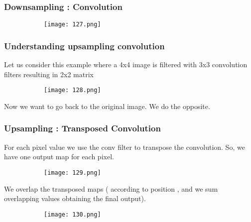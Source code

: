 \documentclass{article}
\begin{document}
\subsubsection{Downsampling : Convolution}

\begin{figure}[ht!]
  \centering
  \begin{subfigure}[b]{0.5\linewidth}
    \texttt{[image: 127.png]}
  \end{subfigure}
\end{figure}

\subsubsection{Understanding upsampling convolution}

Let us consider this example where a 4x4 image is filtered with 3x3 convolution filters resulting in 2x2 matrix 

\begin{figure}[ht!]
  \centering
  \begin{subfigure}[b]{0.5\linewidth}
    \texttt{[image: 128.png]}
  \end{subfigure}
\end{figure}

Now we want to go back to the original image. We do the opposite.

\subsubsection{Upsampling : Transposed Convolution}

For each pixel value we use the conv filter to transpose the convolution. So, we have one output map for each pixel.

\begin{figure}[ht!]
  \centering
  \begin{subfigure}[b]{0.5\linewidth}
    \texttt{[image: 129.png]}
  \end{subfigure}
\end{figure}

We overlap the transposed maps ( according to position , and we sum overlapping values obtaining the final output).

\begin{figure}[ht!]
  \centering
  \begin{subfigure}[b]{0.5\linewidth}
    \texttt{[image: 130.png]}
  \end{subfigure}
\end{figure}
\end{document}
